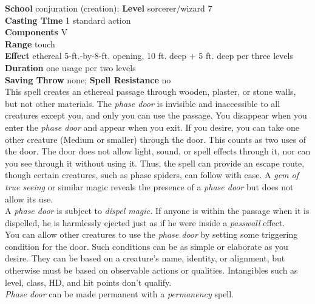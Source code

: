 \textbf{School} conjuration (creation); \textbf{Level} sorcerer/wizard 7\\
\textbf{Casting Time} 1 standard action\\
\textbf{Components} V\\
\textbf{Range} touch\\
\textbf{Effect} ethereal 5-ft.-by-8-ft. opening, 10 ft. deep + 5 ft. deep per three levels\\
\textbf{Duration} one usage per two levels\\
\textbf{Saving Throw} none; \textbf{Spell Resistance} no\\
This spell creates an ethereal passage through wooden, plaster, or stone walls, but not other materials. The \textit{phase door }is invisible and inaccessible to all creatures except you, and only you can use the passage. You disappear when you enter the \textit{phase door }and appear when you exit. If you desire, you can take one other creature (Medium or smaller) through the door. This counts as two uses of the door. The door does not allow light, sound, or spell effects through it, nor can you see through it without using it. Thus, the spell can provide an escape route, though certain creatures, such as phase spiders, can follow with ease. A \textit{gem of true seeing }or similar magic reveals the presence of a \textit{phase door }but does not allow its use.\\
A \textit{phase door }is subject to \textit{dispel magic. }If anyone is within the passage when it is dispelled, he is harmlessly ejected just as if he were inside a \textit{passwall }effect.\\
You can allow other creatures to use the \textit{phase door }by setting some triggering condition for the door. Such conditions can be as simple or elaborate as you desire. They can be based on a creature's name, identity, or alignment, but otherwise must be based on observable actions or qualities. Intangibles such as level, class, HD, and hit points don't qualify.\\
\textit{Phase door }can be made permanent with a \textit{permanency }spell.\\

